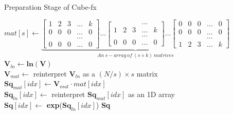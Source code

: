 \begin{algorithm}[tb]
    \caption{Preparation Stage of Cube-fx}
    \setlength{\arraycolsep}{1.2pt}
    \label{alg:prepare}
        
    
    \BlankLine
    \BlankLine
    
    $mat[s] \leftarrow 
            \underbrace{            
                \begin{bmatrix} 1 & 2 & 3 & \dots & k   \\ 
                                0 & 0 & 0 & \dots & 0   \\
                                  &   &   & \dots &     \\ 
                                0 & 0 & 0 & \dots & 0 
                \end{bmatrix}
                \dots
                \begin{bmatrix}   &   &   & \dots &     \\ 
                                1 & 2 & 3 & \dots & k   \\ 
                                  &   &   & \dots &     \\ 
                                0 & 0 & 0 & \dots & 0 
                \end{bmatrix}
                \dots
                \begin{bmatrix} 0 & 0 & 0 & \dots & 0   \\ 
                                0 & 0 & 0 & \dots & 0   \\
                                  &   &   & \dots &     \\ 
                                1 & 2 & 3 & \dots & k
                \end{bmatrix}
            }_{An\ s-array\ of\ (s \times k)\ matrices}
    $ \\
    \BlankLine
    \BlankLine
    $\textbf{V}_{ln} \leftarrow \textbf{ln}(\textbf{V})$ \\
    $\textbf{V}_{mat} \leftarrow$ reinterpret $\textbf{V}_{ln}$ as a $(N / s) \times s$ matrix \\
     {
        $\textbf{Sq}_{mat}[idx] \leftarrow \textbf{V}_{mat} \cdot mat[idx]$ \\
        $\textbf{Sq}_{ln}[idx] \leftarrow$ reinterpret $\textbf{Sq}_{mat}[idx]$ as an 1D array \\
        $\textbf{Sq}[idx] \leftarrow $ \textbf{exp}($\textbf{Sq}_{ln}[idx]$)
    }
    \Return \textbf{Sq}
\end{algorithm}

